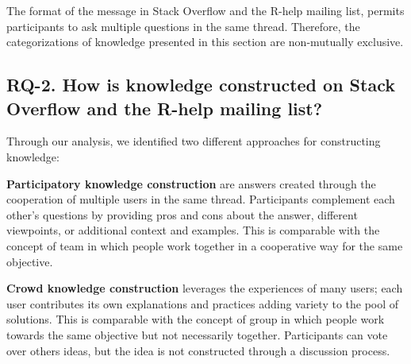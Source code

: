 \documentclass{sig-alternate-05-2015}
\begin{document}

	The format of the message in Stack Overflow and the R-help mailing list, permits participants to ask multiple questions in the same thread.
	Therefore, the categorizations of knowledge presented in this section are non-mutually exclusive.

\subsection{RQ-2. How is knowledge constructed on Stack Overflow and the R-help mailing list?}
\label{sec:rq2}


	Through our analysis, we identified two different approaches for constructing knowledge:
	\begin{packed_enum}
		\item \textbf{Participatory knowledge construction} are answers created through the cooperation of multiple users in the same thread.
		Participants complement each other's questions by providing pros and cons about the answer, different viewpoints, or additional context and examples.
		This is comparable with the concept of team in which people work together in a cooperative way for the same objective.

		\item \textbf{Crowd knowledge construction} leverages the experiences of many users; each user contributes its own explanations and practices adding variety to the pool of solutions.
		This is comparable with the concept of group in which people work towards the same objective but not necessarily together.
		Participants can vote over others ideas, but the idea is not constructed through a discussion process.
	\end{packed_enum}
\end{document}
